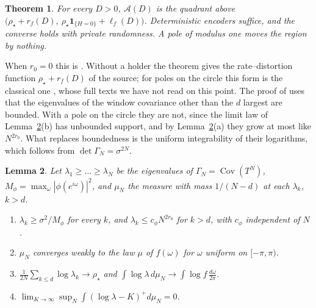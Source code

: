\documentclass[11pt,onecolumn]{IEEEtran}
\newtheorem{theorem}{Theorem}
\newtheorem{lemma}[theorem]{Lemma}
\newcommand{\Cov}{\operatorname{Cov}}
\newcommand{\dw}{\tfrac{d\omega}{2\pi}}
\begin{document}
\begin{theorem}\label{thm:circle}
For every $D>0$, $\mathcal A(D)$ is the quadrant above
$\bigl(\rho_\star+r_f(D),\ \rho_\star\mathbf 1_{\{H=0\}}+\ell_f(D)\bigr)$.
Deterministic encoders suffice, and the converse holds with private
randomness. A pole of modulus one moves the region by nothing.
\end{theorem}

When $r_0=0$ this is \cite[Theorem~26 and Corollary~27]{part3}. Without a
holder the theorem gives the rate--distortion function
$\rho_\star+r_f(D)$ of the source; for poles on the circle this form is
the classical one \cite{gray1970,grayhashimoto2008}, whose full texts
we have not read on this point. The proof of \cite[Theorem~26]{part3}
uses that the eigenvalues of the window covariance other than the $d$
largest are bounded. With a pole on the circle they are not, since the
limit law of Lemma~\ref{lem:circleeig}(b) has unbounded support, and by
Lemma~\ref{lem:circleeig}(a) they grow at most like $N^{2r_0}$. What
replaces boundedness is the
uniform integrability of their logarithms, which follows from
$\det\Gamma_N=\sigma^{2N}$.

\begin{lemma}\label{lem:circleeig}
Let $\lambda_1\ge\dots\ge\lambda_N$ be the eigenvalues of
$\Gamma_N=\Cov(T^N)$, $M_\phi=\max_\omega|\phi(e^{i\omega})|^2$, and $\mu_N$
the measure with mass $1/(N-d)$ at each $\lambda_k$, $k>d$.
\begin{enumerate}
\item[(a)] $\lambda_k\ge\sigma^2/M_\phi$ for every $k$, and
$\lambda_k\le c_\phi N^{2r_0}$ for $k>d$, with $c_\phi$ independent of $N$.
\item[(b)] $\mu_N$ converges weakly to the law $\mu$ of $f(\omega)$ for
$\omega$ uniform on $[-\pi,\pi)$.
\item[(c)] $\tfrac1{2N}\sum_{k\le d}\log\lambda_k\to\rho_\star$ and
$\int\log\lambda\,d\mu_N\to\int\log f\,\dw$.
\item[(d)] $\lim_{K\to\infty}\sup_N\int(\log\lambda-K)^+d\mu_N=0$.
\end{enumerate}
\end{lemma}
\end{document}
